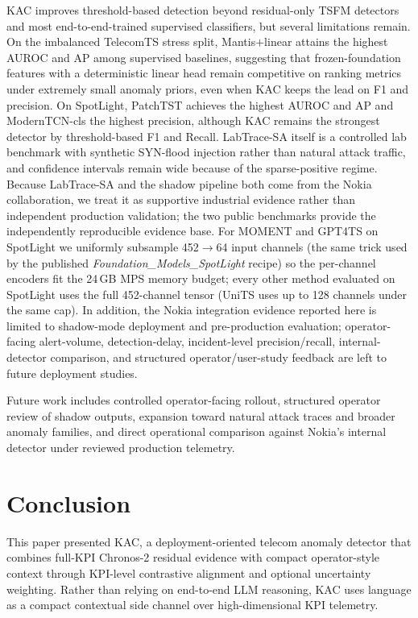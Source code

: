\documentclass[conference]{IEEEtran}
\begin{document}
KAC improves threshold-based detection beyond residual-only TSFM detectors and most end-to-end-trained supervised classifiers, but several limitations remain. On the imbalanced TelecomTS stress split, Mantis$+$linear attains the highest AUROC and AP among supervised baselines, suggesting that frozen-foundation features with a deterministic linear head remain competitive on ranking metrics under extremely small anomaly priors, even when KAC keeps the lead on F1 and precision. On SpotLight, PatchTST achieves the highest AUROC and AP and ModernTCN-cls the highest precision, although KAC remains the strongest detector by threshold-based F1 and Recall. LabTrace-SA itself is a controlled lab benchmark with synthetic SYN-flood injection rather than natural attack traffic, and confidence intervals remain wide because of the sparse-positive regime. Because LabTrace-SA and the shadow pipeline both come from the Nokia collaboration, we treat it as supportive industrial evidence rather than independent production validation; the two public benchmarks provide the independently reproducible evidence base. For MOMENT and GPT4TS on SpotLight we uniformly subsample 452$\to$64 input channels (the same trick used by the published \textit{Foundation\_Models\_SpotLight} recipe) so the per-channel encoders fit the 24\,GB MPS memory budget; every other method evaluated on SpotLight uses the full 452-channel tensor (UniTS uses up to 128 channels under the same cap). In addition, the Nokia integration evidence reported here is limited to shadow-mode deployment and pre-production evaluation; operator-facing alert-volume, detection-delay, incident-level precision/recall, internal-detector comparison, and structured operator/user-study feedback are left to future deployment studies.

Future work includes controlled operator-facing rollout, structured operator review of shadow outputs, expansion toward natural attack traces and broader anomaly families, and direct operational comparison against Nokia's internal detector under reviewed production telemetry.

\section{Conclusion}

This paper presented KAC, a deployment-oriented telecom anomaly detector that combines full-KPI Chronos-2 residual evidence with compact operator-style context through KPI-level contrastive alignment and optional uncertainty weighting. Rather than relying on end-to-end LLM reasoning, KAC uses language as a compact contextual side channel over high-dimensional KPI telemetry.
\end{document}
